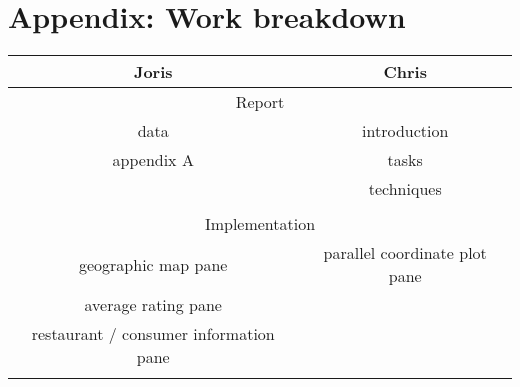 \section{Appendix: Work breakdown}\label{app:appB}


\begin{center}
  \begin{tabular}{| c | c |}
    \hline
    Joris & Chris \\ \hline\hline
    \multicolumn{2}{|c|}{Report} \\ \hline\hline
    data &  introduction\\ \hline
    appendix A &  tasks\\ \hline
     &  techniques\\ \hline
     &  \\ \hline\hline
    \multicolumn{2}{|c|}{Implementation} \\ \hline\hline
    geographic map pane & parallel coordinate plot pane \\ \hline
    average rating pane &  \\ \hline
    restaurant / consumer information pane &  \\ \hline
     &  \\ \hline
  \end{tabular}
\end{center}



